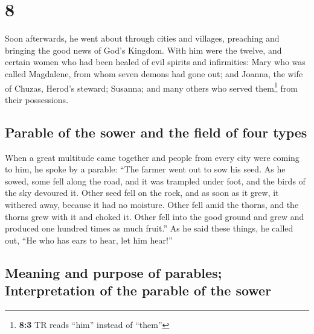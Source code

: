 \hypertarget{section-7}{%
\section{8}\label{section-7}}

 Soon afterwards, he went about through cities and
villages, preaching and bringing the good news of God's Kingdom. With
him were the twelve,  and certain women who had been
healed of evil spirits and infirmities: Mary who was called Magdalene,
from whom seven demons had gone out;  and Joanna, the wife
of Chuzas, Herod's steward; Susanna; and many others who served
them\footnote{\textbf{8:3} TR reads ``him'' instead of ``them''} from
their possessions.

\hypertarget{parable-of-the-sower-and-the-field-of-four-types}{%
\subsection{Parable of the sower and the field of four
types}\label{parable-of-the-sower-and-the-field-of-four-types}}

 When a great multitude came together and people from
every city were coming to him, he spoke by a parable: 
``The farmer went out to sow his seed. As he sowed, some fell along the
road, and it was trampled under foot, and the birds of the sky devoured
it.  Other seed fell on the rock, and as soon as it grew,
it withered away, because it had no moisture.  Other fell
amid the thorns, and the thorns grew with it and choked it.
 Other fell into the good ground and grew and produced one
hundred times as much fruit.'' As he said these things, he called out,
``He who has ears to hear, let him hear!''

\hypertarget{meaning-and-purpose-of-parables-interpretation-of-the-parable-of-the-sower}{%
\subsection{Meaning and purpose of parables; Interpretation of the
parable of the
sower}\label{meaning-and-purpose-of-parables-interpretation-of-the-parable-of-the-sower}}

